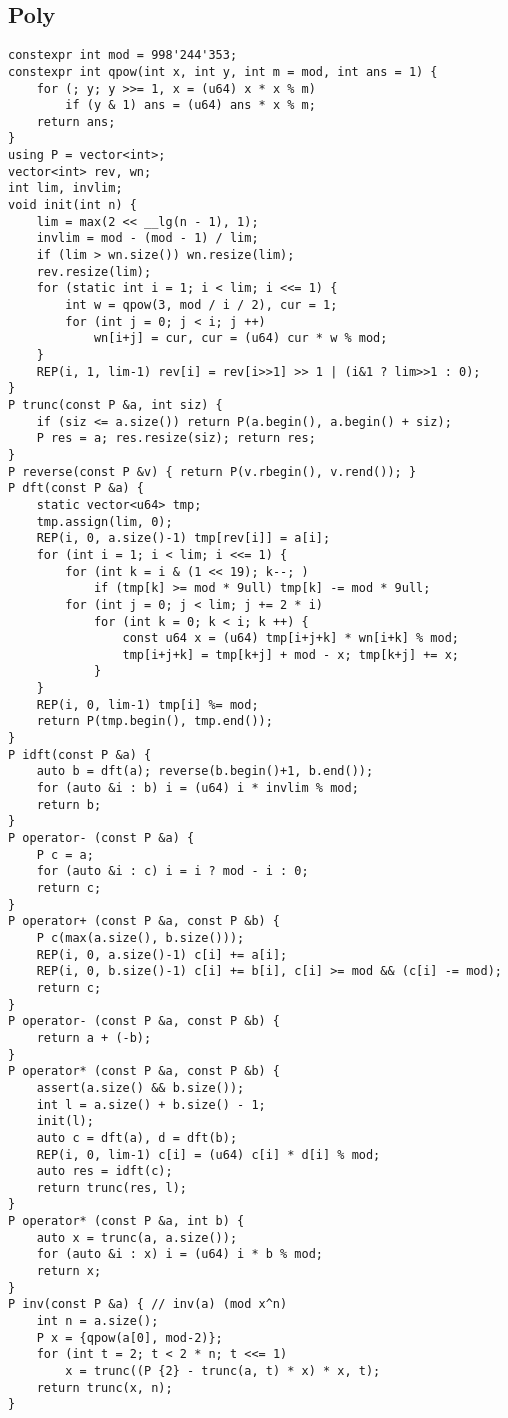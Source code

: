 \documentclass[a4paper,landscape,twocolumn]{ctexart}
\begin{document}
\subsection{Poly}

\begin{lstlisting}[]
constexpr int mod = 998'244'353;
constexpr int qpow(int x, int y, int m = mod, int ans = 1) {
	for (; y; y >>= 1, x = (u64) x * x % m)
		if (y & 1) ans = (u64) ans * x % m;
	return ans;
}
using P = vector<int>;
vector<int> rev, wn;
int lim, invlim;
void init(int n) {
	lim = max(2 << __lg(n - 1), 1);
	invlim = mod - (mod - 1) / lim;
	if (lim > wn.size()) wn.resize(lim);
	rev.resize(lim);
	for (static int i = 1; i < lim; i <<= 1) {
		int w = qpow(3, mod / i / 2), cur = 1;
		for (int j = 0; j < i; j ++)
			wn[i+j] = cur, cur = (u64) cur * w % mod;
	}
	REP(i, 1, lim-1) rev[i] = rev[i>>1] >> 1 | (i&1 ? lim>>1 : 0);
}
P trunc(const P &a, int siz) {
	if (siz <= a.size()) return P(a.begin(), a.begin() + siz);
	P res = a; res.resize(siz); return res;
}
P reverse(const P &v) { return P(v.rbegin(), v.rend()); }
P dft(const P &a) {
	static vector<u64> tmp;
	tmp.assign(lim, 0);
	REP(i, 0, a.size()-1) tmp[rev[i]] = a[i];
	for (int i = 1; i < lim; i <<= 1) {
		for (int k = i & (1 << 19); k--; )
			if (tmp[k] >= mod * 9ull) tmp[k] -= mod * 9ull;
		for (int j = 0; j < lim; j += 2 * i)
			for (int k = 0; k < i; k ++) {
				const u64 x = (u64) tmp[i+j+k] * wn[i+k] % mod;
				tmp[i+j+k] = tmp[k+j] + mod - x; tmp[k+j] += x;
			}
	}
	REP(i, 0, lim-1) tmp[i] %= mod;
	return P(tmp.begin(), tmp.end());
}
P idft(const P &a) {
	auto b = dft(a); reverse(b.begin()+1, b.end());
	for (auto &i : b) i = (u64) i * invlim % mod;
	return b;
}
P operator- (const P &a) {
	P c = a;
	for (auto &i : c) i = i ? mod - i : 0;
	return c;
}
P operator+ (const P &a, const P &b) {
	P c(max(a.size(), b.size()));
	REP(i, 0, a.size()-1) c[i] += a[i];
	REP(i, 0, b.size()-1) c[i] += b[i], c[i] >= mod && (c[i] -= mod);
	return c;
}
P operator- (const P &a, const P &b) {
	return a + (-b);
}
P operator* (const P &a, const P &b) {
	assert(a.size() && b.size());
	int l = a.size() + b.size() - 1;
	init(l);
	auto c = dft(a), d = dft(b);
	REP(i, 0, lim-1) c[i] = (u64) c[i] * d[i] % mod;
	auto res = idft(c);
	return trunc(res, l);
}
P operator* (const P &a, int b) {
	auto x = trunc(a, a.size());
	for (auto &i : x) i = (u64) i * b % mod;
	return x;
}
P inv(const P &a) { // inv(a) (mod x^n)
	int n = a.size();
	P x = {qpow(a[0], mod-2)};
	for (int t = 2; t < 2 * n; t <<= 1)
		x = trunc((P {2} - trunc(a, t) * x) * x, t);
	return trunc(x, n);
}

\end{lstlisting}
\end{document}
